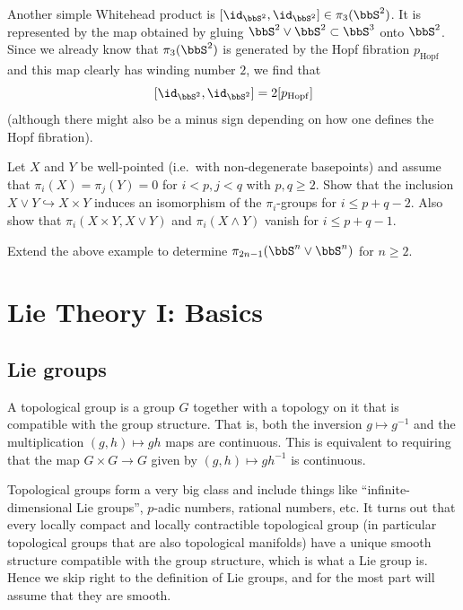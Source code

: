 \begin{example}
    Another simple Whitehead product is $[\id_{\bbS^2},\id_{\bbS^2}]\in\pi_3(\bbS^2)$. It is represented by the map obtained by gluing $\bbS^2\vee \bbS^2\subset \bbS^3$ onto $\bbS^2$. Since we already know that $\pi_3(\bbS^2)$ is generated by the Hopf fibration $p_{\mathrm{Hopf}}$ and this map clearly has winding number $2$, we find that 
    \[[\id_{\bbS^2},\id_{\bbS^2}]=2[p_{\mathrm{Hopf}}]\]
    (although there might also be a minus sign depending on how one defines the Hopf fibration).
\end{example}

\begin{xca}
    Let $X$ and $Y$ be well-pointed (i.e.~with non-degenerate basepoints) and assume that $\pi_i(X)=\pi_j(Y)=0$ for $i<p,j<q$ with $p,q\geq 2$. Show that the inclusion $X\vee Y\hookrightarrow X\times Y$ induces an isomorphism of the $\pi_i$-groups for $i\leq p+q-2$. Also show that $\pi_i(X\times Y,X\vee Y)$ and $\pi_i(X\wedge Y)$ vanish for $i\leq p+q-1$.
\end{xca}

\begin{xca}
    Extend the above example to determine $\pi_{2n-1}(\bbS^n\vee \bbS^n)$ for $n\geq 2$.
\end{xca}


\clearpage 

\chapter{Lie Theory I: Basics}

\section{Lie groups}

\begin{defn}
    A topological group is a group $G$ together with a topology on it that is compatible with the group structure. That is, both the inversion $g\mapsto g^{-1}$ and the multiplication $(g,h)\mapsto gh$ maps are continuous. This is equivalent to requiring that the map $G\times G\to G$ given by $(g,h)\mapsto gh^{-1}$ is continuous.
\end{defn}

Topological groups form a very big class and include things like ``infinite-dimensional Lie groups'', $p$-adic numbers, rational numbers, etc. It turns out that every locally compact and locally contractible topological group (in particular topological groups that are also topological manifolds) have a unique smooth structure compatible with the group structure, which is what a Lie group is. Hence we skip right to the definition of Lie groups, and for the most part will assume that they are smooth.

